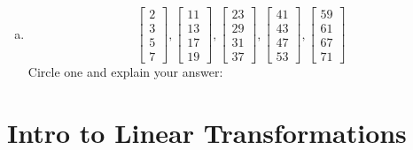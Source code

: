 \begin{exercise}
\begin{multicols}{2}
\begin{enumerate}[(a)]
				\item
					$$
					\begin{bmatrix}  2\\ 3\\ 5\\ 7 \end{bmatrix},
					\begin{bmatrix} 11\\13\\17\\19 \end{bmatrix},
					\begin{bmatrix} 23\\29\\31\\37 \end{bmatrix},
					\begin{bmatrix} 41\\43\\47\\53 \end{bmatrix},
					\begin{bmatrix} 59\\61\\67\\71 \end{bmatrix}
					$$
					Circle one and explain your answer:
					\begin{center}
						 \qquad
					\end{center}
			\end{enumerate}
		\end{multicols}
\end{exercise}
\vfill




\newpage


\section[Introduction to Linear Transformations]{Intro to Linear Transformations}
\name[2in]

